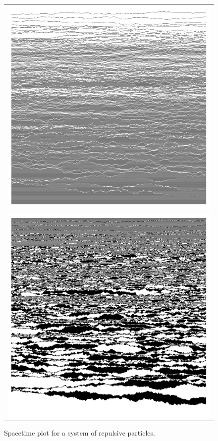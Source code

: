 \begin{figure} \caption[The flow pattern of repulsive particles in $1$D]{Spacetime plot for a system of 
repulsive particles.} 
\label{fig:1DRepulsePlots}
\begin{center}
\begin{tabular}{c} 
\includegraphics[width=0.8\linewidth]{numerics/images/stickyParticleFlows/aprilFlowStraight.png} \\
\includegraphics[width=0.8\linewidth]{numerics/images/stickyParticleFlows/aprilFlowDomains.png} \\
\end{tabular}
\end{center}
 \end{figure}
 
